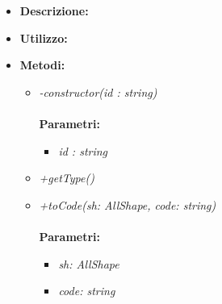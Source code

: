 \begin{itemize}
	\item \textbf{Descrizione:}\\
	
	\item \textbf{Utilizzo:}\\
	
	\item \textbf{Metodi:}
		\begin{itemize}
			\item \emph{-constructor(id : string)}\\
    		\\
    		\textbf{Parametri:}
    		\begin{itemize}
    			\item \emph{id : string}\\
    			
    		\end{itemize}
    		\item \emph{+getType()}\\
    		
    		\item \emph{+toCode(sh: AllShape, code: string)}\\
    		\\
    		\textbf{Parametri:}
    		\begin{itemize}
    			\item \emph{sh: AllShape}\\
    			
    			\item \emph{code: string}\\
    			
    		\end{itemize}
    	\end{itemize}
\end{itemize}